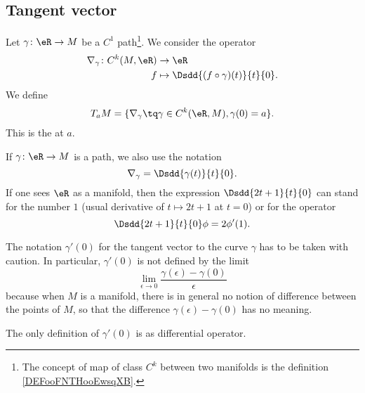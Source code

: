 \subsection{Tangent vector}

\begin{definition}      \label{DEFooJJVIooDUBwDJ}
    Let \( \gamma\colon \eR\to M\) be a \( C^1\) path\footnote{The concept of map of class \( C^k\) between two manifolds is the definition \ref{DEFooFNTHooEwsqXB}.}. We consider the operator
    \begin{equation}
        \begin{aligned}
            \nabla_{\gamma}\colon C^k(M,\eR)&\to \eR \\
            f&\mapsto \Dsdd{ (f\circ\gamma)(t) }{t}{0}. 
        \end{aligned}
    \end{equation}
    We define
    \begin{equation}
        T_aM=\{ \nabla_{\gamma}\tq \gamma\in C^k(\eR,M),\gamma(0)=a \}.
    \end{equation}
    This is the  at \( a\).
\end{definition}

If \( \gamma\colon \eR\to M\) is a path, we also use the notation
\begin{equation}        \label{EQooJQVRooLziKoH}
    \nabla_{\gamma}=\Dsdd{ \gamma(t) }{t}{0}.
\end{equation}
If one sees \( \eR\) as a manifold, then the expression \( \Dsdd{ 2t+1 }{t}{0}\) can stand for the number \( 1\) (usual derivative of \( t\mapsto 2t+1\) at \( t=0\)) or for the operator
\begin{equation}
    \Dsdd{ 2t+1 }{t}{0}\phi=2\phi'(1).
\end{equation}

\begin{remark}      \label{REMooJQFHooQuoZxt}
    The notation \( \gamma'(0)\) for the tangent vector to the curve \( \gamma\) has to be taken with caution. In particular, \( \gamma'(0)\) is not defined by the limit
    \begin{equation}        \label{EQooVMGFooFUCNEY}
        \lim_{\epsilon\to 0} \frac{ \gamma(\epsilon)-\gamma(0) }{ \epsilon }
    \end{equation}
    because when \( M\) is a manifold, there is in general no notion of difference between the points of \( M\), so that the difference \( \gamma(\epsilon)-\gamma(0)\) has no meaning.

    The only definition of \( \gamma'(0)\) is as differential operator.
\end{remark}

